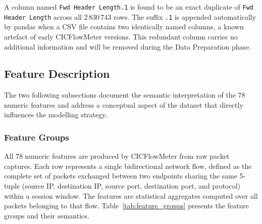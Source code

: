 \documentclass[12pt,a4paper]{article}
\begin{document}
A column named \texttt{Fwd Header Length.1} is found to be an exact duplicate of
\texttt{Fwd Header Length} across all 2\,830\,743 rows. The suffix \texttt{.1} is
appended automatically by pandas when a CSV file contains two identically named
columns, a known artefact of early CICFlowMeter versions. This redundant column
carries no additional information and will be removed during the Data Preparation phase.

\subsection{Feature Description}

The two following subsections document the semantic interpretation of the 78 numeric
features and address a conceptual aspect of the dataset that directly influences the
modelling strategy.

\subsubsection{Feature Groups}

All 78 numeric features are produced by CICFlowMeter from raw packet captures.
Each row represents a single bidirectional network flow, defined as the complete
set of packets exchanged between two endpoints sharing the same 5-tuple (source IP,
destination IP, source port, destination port, and protocol) within a session window.
The features are statistical aggregates computed over all packets belonging to that
flow. Table~\ref{tab:feature_groups} presents the feature groups and their semantics.
\end{document}
